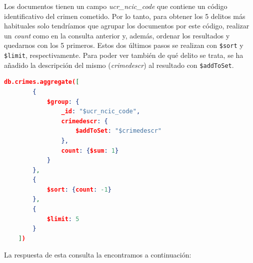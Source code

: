 \documentclass{article}
\begin{document}
Los documentos tienen un campo \textit{ucr\_ncic\_code} que contiene un código
identificativo del crimen cometido. Por lo tanto, para obtener los 5 delitos más
habituales solo tendríamos que agrupar los documentos por este código, realizar
un \textit{count} como en la consulta anterior y, además, ordenar los resultados
y quedarnos con los 5 primeros. Estos dos últimos pasos se realizan con
\texttt{\$sort} y \texttt{\$limit}, respectivamente. Para poder ver también de
qué delito se trata, se ha añadido la descripción del mismo
(\textit{crimedescr}) al resultado con \texttt{\$addToSet}.

\begin{lstlisting}[language=JSON]
    db.crimes.aggregate([
        {
            $group: {
                _id: "$ucr_ncic_code",
                crimedescr: {
                    $addToSet: "$crimedescr"
                },
                count: {$sum: 1}
            }
        },
        {
            $sort: {count: -1}
        },
        {
            $limit: 5
        }
    ])
\end{lstlisting}

La respuesta de esta consulta la encontramos a continuación:
\end{document}
